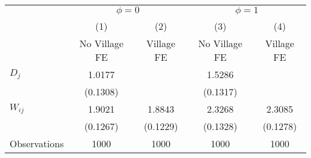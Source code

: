 {
\def\sym#1{\ifmmode^{#1}\else\(^{#1}\)\fi}
\begin{tabular}{l*{4}{c}}
\hline\hline
                    &\multicolumn{2}{c}{$\phi = 0$}&\multicolumn{2}{c}{$\phi = 1$}\\\cmidrule(lr){2-3}\cmidrule(lr){4-5}
                    &\multicolumn{1}{c}{(1)}&\multicolumn{1}{c}{(2)}&\multicolumn{1}{c}{(3)}&\multicolumn{1}{c}{(4)}\\
                    &\multicolumn{1}{c}{No Village FE}&\multicolumn{1}{c}{Village FE}&\multicolumn{1}{c}{No Village FE}&\multicolumn{1}{c}{Village FE}\\
\hline
$D_j$               &      1.0177&            &      1.5286&            \\
                    &    (0.1308)&            &    (0.1317)&            \\
$W_{ij}$            &      1.9021&      1.8843&      2.3268&      2.3085\\
                    &    (0.1267)&    (0.1229)&    (0.1328)&    (0.1278)\\
\hline
Observations        &        1000&        1000&        1000&        1000\\
\hline\hline
\end{tabular}
}
